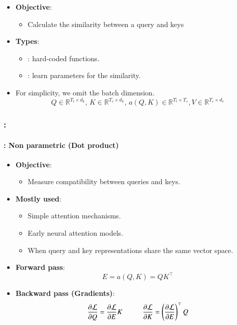 \documentclass[xcolor=table]{beamer}
\begin{document}
	\begin{subsectionframe}
		\begin{itemize}
			\item \textbf{Objective}:
			\begin{itemize}
				\item Calculate the similarity between a query and keys
			\end{itemize}
			\item \textbf{Types}:
			\begin{itemize}
				\item {}: hard-coded functions.
				\item {}: learn parameters for the similarity.
			\end{itemize}
			\item For simplicity, we omit the batch dimension.
			\[Q \in \mathbb{R}^{T_t \times d_k}, \, K \in \mathbb{R}^{T_s \times d_k}, \, a(Q, K) \in \mathbb{R}^{T_t \times T_s}, V \in \mathbb{R}^{T_s \times d_v} \]
		\end{itemize}
	\end{subsectionframe}
	
	\begin{frame}
		\frametitle{\insertshortsubtitle: \insertsection}
		\framesubtitle{\insertsubsection: Non parametric (Dot product)}
		
		\begin{itemize}
			\item \textbf{Objective}:
			\begin{itemize}
				\item Measure compatibility between queries and keys.
			\end{itemize}
			
			\item \textbf{Mostly used}:
			\begin{itemize}
				\item Simple attention mechanisms.
				\item Early neural attention models.
				\item When query and key representations share the same vector space.
			\end{itemize}
			
			\item \textbf{Forward pass}:
			\[E = a(Q, K) = Q K^\top\]
			
			\item \textbf{Backward pass (Gradients)}:
			\[
			\frac{\partial \mathcal{L}}{\partial Q}
			=
			\frac{\partial \mathcal{L}}{\partial E} K
			\hskip1cm
			\frac{\partial \mathcal{L}}{\partial K}
			=
			\left(
			\frac{\partial \mathcal{L}}{\partial E}
			\right)^\top Q
			\]
			
		\end{itemize}
		
	\end{frame}
	
\end{document}
